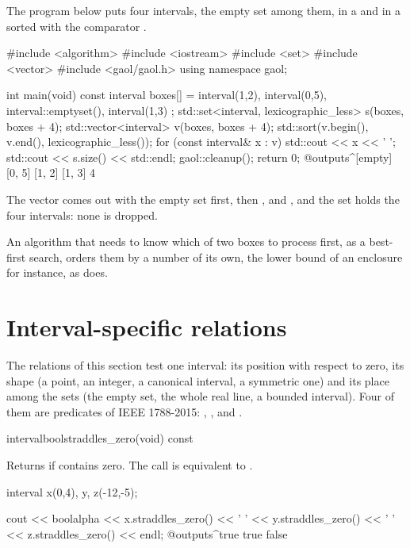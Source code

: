 \begin{Ex}\label{ex:relations-containers}
The program below puts four intervals, the empty set among them, in a
 and in a sorted  with the comparator
.
\begin{example}
#include <algorithm>
#include <iostream>
#include <set>
#include <vector>
#include <gaol/gaol.h>
using namespace gaol;

int main(void)
{
  const interval boxes[] = { interval(1,2), interval(0,5),
                             interval::emptyset(), interval(1,3) };
  std::set<interval, lexicographic_less> s(boxes, boxes + 4);
  std::vector<interval> v(boxes, boxes + 4);
  std::sort(v.begin(), v.end(), lexicographic_less());
  for (const interval& x : v) std::cout << x << ' ';
  std::cout << s.size() << std::endl;
  gaol::cleanup();
  return 0;
}
@outputs^[empty] [0, 5] [1, 2] [1, 3] 4~
\end{example}
The vector comes out with the empty set first, then , 
and , and the set holds the four intervals: none is dropped.
\end{Ex}

\medskip
An algorithm that needs to know which of two boxes to process first, as a
best-first search, orders them by a number of its own, the lower bound of an
enclosure for instance, as  does.

\section{Interval-specific relations}\label{sec:relations-specific}
%

The relations of this section test one interval: its position with respect
to zero, its shape (a point, an integer, a canonical interval, a symmetric
one) and its place among the sets (the empty set, the whole real line, a
bounded interval). Four of them are predicates of IEEE 1788-2015:
, ,  and
.

\begin{defmethod}{interval}{bool}{straddles\_zero}{(void) const}
  \begin{operation}
  \end{operation}
  Returns  if  contains zero. The call
   is equivalent to .
\begin{example}
interval x(0,4), y, z(-12,-5);

cout << boolalpha << x.straddles_zero() << ' '
     << y.straddles_zero() << ' '
     << z.straddles_zero() << endl;
@outputs^true true false~
\end{example}
\end{defmethod}

